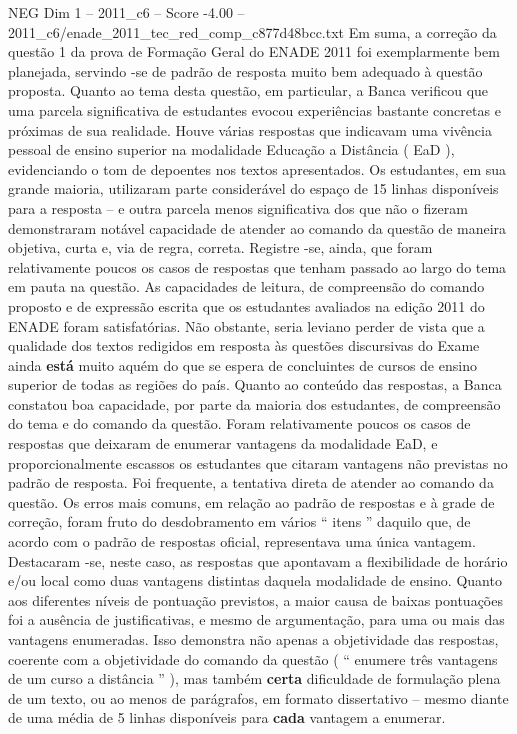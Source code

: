 \begin{textsample}{NEG Dim 1 – 2011\_c6 – Score -4.00 – 2011\_c6/enade\_2011\_tec\_red\_comp\_c877d48bcc.txt}
Em suma, a correção da questão 1 da prova de Formação Geral do ENADE 2011 foi exemplarmente bem planejada, servindo -se de padrão de resposta muito bem adequado à questão proposta.
Quanto ao tema desta questão, em particular, a Banca verificou que uma parcela significativa de estudantes evocou experiências bastante concretas e próximas de sua realidade.
Houve várias respostas que indicavam uma vivência pessoal de ensino superior na modalidade Educação a Distância ( EaD ), evidenciando o tom de depoentes nos textos apresentados.
Os estudantes, em sua grande maioria, utilizaram parte considerável do espaço de 15 linhas disponíveis para a resposta – e outra parcela menos significativa dos que não o fizeram demonstraram notável capacidade de atender ao comando da questão de maneira objetiva, curta e, via de regra, correta.
Registre -se, ainda, que foram relativamente poucos os casos de respostas que tenham passado ao largo do tema em pauta na questão.
As capacidades de leitura, de compreensão do comando proposto e de expressão escrita que os estudantes avaliados na edição 2011 do ENADE foram satisfatórias.
Não obstante, seria leviano perder de vista que a qualidade dos textos redigidos em resposta às questões discursivas do Exame ainda \textbf{está} muito aquém do que se espera de concluintes de cursos de ensino superior de todas as regiões do país.
Quanto ao conteúdo das respostas, a Banca constatou boa capacidade, por parte da maioria dos estudantes, de compreensão do tema e do comando da questão.
Foram relativamente poucos os casos de respostas que deixaram de enumerar vantagens da modalidade EaD, e proporcionalmente escassos os estudantes que citaram vantagens não previstas no padrão de resposta.
Foi frequente, a tentativa direta de atender ao comando da questão.
Os erros mais comuns, em relação ao padrão de respostas e à grade de correção, foram fruto do desdobramento em vários “ itens ” daquilo que, de acordo com o padrão de respostas oficial, representava uma única vantagem.
Destacaram -se, neste caso, as respostas que apontavam a flexibilidade de horário e/ou local como duas vantagens distintas daquela modalidade de ensino.
Quanto aos diferentes níveis de pontuação previstos, a maior causa de baixas pontuações foi a ausência de justificativas, e mesmo de argumentação, para uma ou mais das vantagens enumeradas.
Isso demonstra não apenas a objetividade das respostas, coerente com a objetividade do comando da questão ( “ enumere três vantagens de um curso a distância ” ), mas também \textbf{certa} dificuldade de formulação plena de um texto, ou ao menos de parágrafos, em formato dissertativo – mesmo diante de uma média de 5 linhas disponíveis para \textbf{cada} vantagem a enumerar.

\end{textsample}

